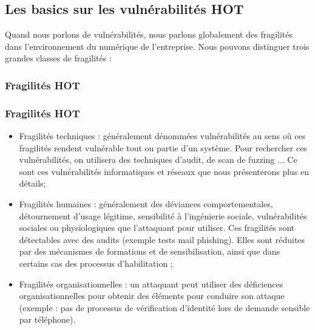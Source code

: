 
\subsection{Les basics sur les vulnérabilités HOT}

Quand nous parlons de vulnérabilités, nous parlons globalement des fragilités dans l’environnement du numérique de l’entreprise. Nous pouvons distinguer trois grandes classes de fragilités :

\begin{frame}
\frametitle<presentation>{Fragilités HOT}
\end{frame}

\begin{frame}
\frametitle<presentation>{Fragilités HOT}
\begin{itemize}
\item Fragilités techniques : généralement dénommées vulnérabilités au sens où ces fragilités rendent vulnérable tout ou partie d’un système. Pour rechercher ces vulnérabilités, on utilisera des techniques d’audit, de scan de fuzzing ... Ce sont ces vulnérabilités informatiques et réseaux que nous présenterons plus en détails;
\item Fragilités humaines : généralement des déviances comportementales, détournement d’usage légitime, sensibilité à l’ingénierie sociale, vulnérabilités sociales ou physiologiques que l’attaquant pour utiliser. Ces fragilités sont détectables avec des audits (exemple tests mail phishing). Elles sont réduites par des mécanismes de formations et de sensibilisation, ainsi que dans certains cas des processus d’habilitation ;
\item Fragilités organisationnelles : un attaquant peut utiliser des déficiences organisationnelles pour obtenir des éléments pour conduire son attaque (exemple : pas de processus de vérification d’identité lors de demande sensible par téléphone).
\end{itemize}
\end{frame}



